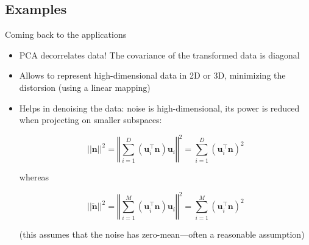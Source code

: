 \documentclass{beamer}
\begin{document}
\subsection{Examples}
\begin{frame}{Coming back to the applications}
\begin{itemize}
\item PCA decorrelates data! The covariance of the transformed data is diagonal
\item Allows to represent high-dimensional data in 2D or 3D, minimizing the distorsion (using a linear mapping)
\item Helps in denoising the data: noise is high-dimensional, its power is reduced when projecting on smaller subspaces:

\begin{equation*}
||\mathbf{n}||^{2} = \left\Vert\sum_{i=1}^{D} (\mathbf{u}_{i}^{\top}\mathbf{n})\mathbf{u}_{i}\right\Vert ^{2} = \sum_{i=1}^{D} \left(\mathbf{u}_{i}^{\top}\mathbf{n} \right)^2
\end{equation*}

whereas

\begin{equation*}
||\tilde{\mathbf{n}}||^{2} = \left\Vert\sum_{i=1}^{M} (\mathbf{u}_{i}^{\top}{\mathbf{n}})\mathbf{u}_{i}\right\Vert ^{2} = \sum_{i=1}^{M} \left(\mathbf{u}_{i}^{\top}{\mathbf{n}}\right)^2
\end{equation*}


(this assumes that the noise has zero-mean---often a reasonable assumption)

\end{itemize}
\end{frame}
\end{document}
